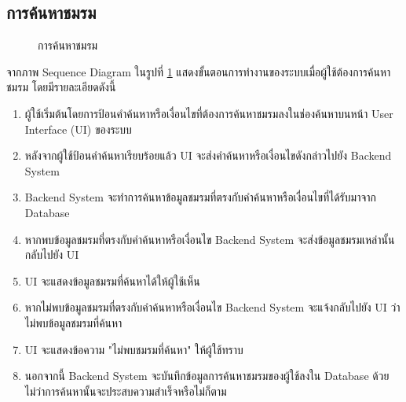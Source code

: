 \documentclass[14pt,oneside,openright,a4paper]{cpe-thai-project}
\begin{document}
  \newpage

\subsection{การค้นหาชมรม}

  \begin{figure}[!h]\centering
    \setlength{\fboxrule}{0.5mm} %
    \setlength{\fboxsep}{0.5cm}
    \caption{การค้นหาชมรม}\label{fig:Seacrh club}
  \end{figure}

  จากภาพ Sequence Diagram ในรูปที่ \ref{fig:Seacrh club} แสดงขั้นตอนการทำงานของระบบเมื่อผู้ใช้ต้องการค้นหาชมรม โดยมีรายละเอียดดังนี้
  \begin{enumerate}
    \item ผู้ใช้เริ่มต้นโดยการป้อนคำค้นหาหรือเงื่อนไขที่ต้องการค้นหาชมรมลงในช่องค้นหาบนหน้า User Interface (UI) ของระบบ
    \item หลังจากผู้ใช้ป้อนคำค้นหาเรียบร้อยแล้ว UI จะส่งคำค้นหาหรือเงื่อนไขดังกล่าวไปยัง Backend System
    \item Backend System จะทำการค้นหาข้อมูลชมรมที่ตรงกับคำค้นหาหรือเงื่อนไขที่ได้รับมาจาก Database
    \item หากพบข้อมูลชมรมที่ตรงกับคำค้นหาหรือเงื่อนไข Backend System จะส่งข้อมูลชมรมเหล่านั้นกลับไปยัง UI
    \item UI จะแสดงข้อมูลชมรมที่ค้นหาได้ให้ผู้ใช้เห็น
    \item หากไม่พบข้อมูลชมรมที่ตรงกับคำค้นหาหรือเงื่อนไข Backend System จะแจ้งกลับไปยัง UI ว่าไม่พบข้อมูลชมรมที่ค้นหา
    \item UI จะแสดงข้อความ "ไม่พบชมรมที่ค้นหา" ให้ผู้ใช้ทราบ
    \item นอกจากนี้ Backend System จะบันทึกข้อมูลการค้นหาชมรมของผู้ใช้ลงใน Database ด้วย ไม่ว่าการค้นหานั้นจะประสบความสำเร็จหรือไม่ก็ตาม
  \end{enumerate}
\end{document}
